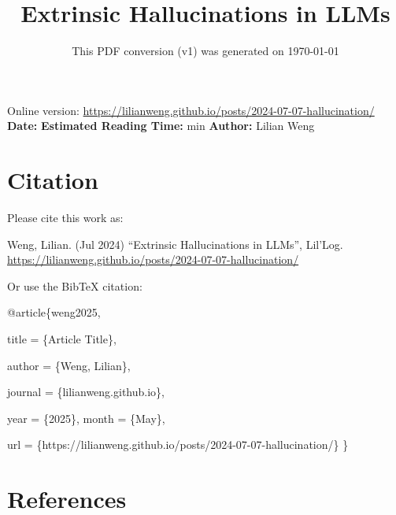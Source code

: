 \documentclass[12pt]{article}
\title{Extrinsic Hallucinations in LLMs}
\date{This PDF conversion (v1) was generated on \today\footnotemark}
\begin{document}
\maketitle
\begin{center}
    Online version: \url{https://lilianweng.github.io/posts/2024-07-07-hallucination/} \\
    \textbf{Date:} \quad
    \textbf{Estimated Reading Time:}  min \quad
    \textbf{Author:} Lilian Weng
\end{center}




\newpage
\tableofcontents
\newpage
\vspace{1em}
\n\n\n\section{Citation}
Please cite this work as:

\begin{tcolorbox}[colback=black!5!white, colframe=black!80!white, boxrule=0.5pt, arc=2mm, left=1mm, right=1mm, top=1mm, bottom=1mm]
  Weng, Lilian. (Jul 2024) ``Extrinsic Hallucinations in LLMs'', Lil'Log. \url{https://lilianweng.github.io/posts/2024-07-07-hallucination/}
  \end{tcolorbox}

Or use the BibTeX citation:

\begin{tcolorbox}[
    colback=black!5!white,
    colframe=black!80!white,
    boxrule=0.5pt,
    arc=2mm,
    left=1mm,
    right=1mm,
    top=1mm,
    bottom=1mm,
    listing only,
    listing options={
      basicstyle=\ttfamily\footnotesize,
      breaklines=true,
      literate={\{}{{\char`\{}}1 {\}}{{\char`\}}}1
    }
  ]
  @article\{weng2025,

    title   = \{Article Title\},

    author  = \{Weng, Lilian\},

    journal = \{lilianweng.github.io\},

    year    = \{2025\},
    month   = \{May\},

    url     = \{https://lilianweng.github.io/posts/2024-07-07-hallucination/\}\n
  \}
  \end{tcolorbox}

\newpage
\section{References}

\n
\end{document}
